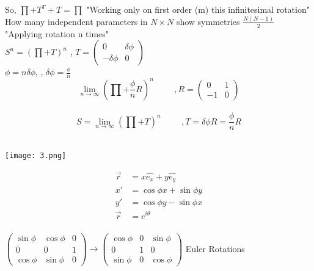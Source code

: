 \documentclass[12]{article}
\begin{document}
 So, $\prod + T^{T} + T=\prod$ \hspace{5mm} "Working only on first order (m) this infinitesimal rotation"\\
 
 How many independent parameters in $N \times N$ show symmetries $\frac{N(N-1)}{2}$\\
 
 "Applying rotation n times"\\
 $S^{n}=(\prod + T)^{n}$ \hspace{5mm} , $T=\begin{pmatrix}
 0 & \delta \phi\\
 -\delta \phi & 0
 \end{pmatrix}$\\
 
 $\phi = n \delta \phi$, \hspace{5mm}, $\delta \phi=\frac{\phi}{n}$\\
 
$$\lim_{n \to \infty} \left(\prod +\frac{\phi}{n}R \right)^{n} \hspace{1cm} ,R=\begin{pmatrix}
0 & 1\\
-1 & 0
\end{pmatrix}$$\\

$$S=\lim_{n\to\infty} \left(\prod +T \right)^{n}\hspace{1cm} , T=\delta \phi R =\frac{\phi}{n}R$$\\

\begin{center}
\texttt{[image: 3.png]}
\end{center}
 
\begin{align*}
\vec{r} & =x\hat{e_{x}}+y\hat{e_{y}}\\
x' & =\cos \phi x+ \sin \phi y\\
y' & = \cos \phi y - \sin \phi x\\
\vec{r} & =e^{i \theta}\\
\end{align*} 

$\begin{pmatrix}
\sin \phi & \cos \phi & 0\\
0 & 0 & 1\\
\cos \phi & \sin \phi & 0
\end{pmatrix} \rightarrow \begin{pmatrix}
\cos \phi & 0 & \sin \phi\\
0 & 1 & 0\\
\sin \phi & 0 & \cos \phi 
\end{pmatrix}$ \hspace{5mm} Euler Rotations\\
\vspace{5mm}
\end{document}
